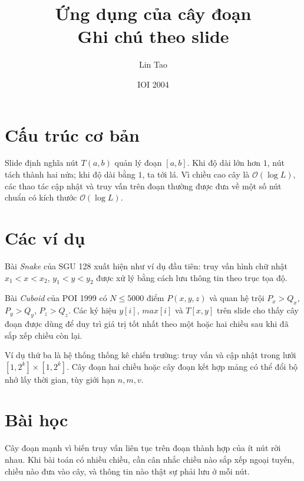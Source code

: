 \documentclass[11pt]{article}
\title{Ứng dụng của cây đoạn\\{\large Ghi chú theo slide}}
\author{Lin Tao}
\date{IOI 2004}
\newcommand{\Oh}{\mathcal{O}}
\begin{document}
\maketitle


\section{Cấu trúc cơ bản}

Slide định nghĩa nút \(T(a,b)\) quản lý đoạn \([a,b]\). Khi độ dài lớn hơn
\(1\), nút tách thành hai nửa; khi độ dài bằng \(1\), ta tới lá. Vì chiều cao
cây là \(\Oh(\log L)\), các thao tác cập nhật và truy vấn trên đoạn thường
được đưa về một số nút chuẩn có kích thước \(\Oh(\log L)\).

\section{Các ví dụ}

Bài \emph{Snake} của SGU 128 xuất hiện như ví dụ đầu tiên: truy vấn hình chữ
nhật \(x_1<x<x_2\), \(y_1<y<y_2\) được xử lý bằng cách lưu thông tin theo
trục tọa độ.

Bài \emph{Cuboid} của POI 1999 có \(N\le 5000\) điểm \(P(x,y,z)\) và quan hệ
trội \(P_x>Q_x\), \(P_y>Q_y\), \(P_z>Q_z\). Các ký hiệu \(y[i]\),
\(\mathit{max}[i]\) và \(T[x,y]\) trên slide cho thấy cây đoạn được dùng để
duy trì giá trị tốt nhất theo một hoặc hai chiều sau khi đã sắp xếp chiều còn
lại.

Ví dụ thứ ba là hệ thống thống kê chiến trường: truy vấn và cập nhật trong
lưới \([1,2^k]\times[1,2^k]\). Cây đoạn hai chiều hoặc cây đoạn kết hợp mảng
có thể đổi bộ nhớ lấy thời gian, tùy giới hạn \(n,m,v\).

\section{Bài học}

Cây đoạn mạnh vì biến truy vấn liên tục trên đoạn thành hợp của ít nút rời
nhau. Khi bài toán có nhiều chiều, cần cân nhắc chiều nào sắp xếp ngoại tuyến,
chiều nào đưa vào cây, và thông tin nào thật sự phải lưu ở mỗi nút.
\end{document}
